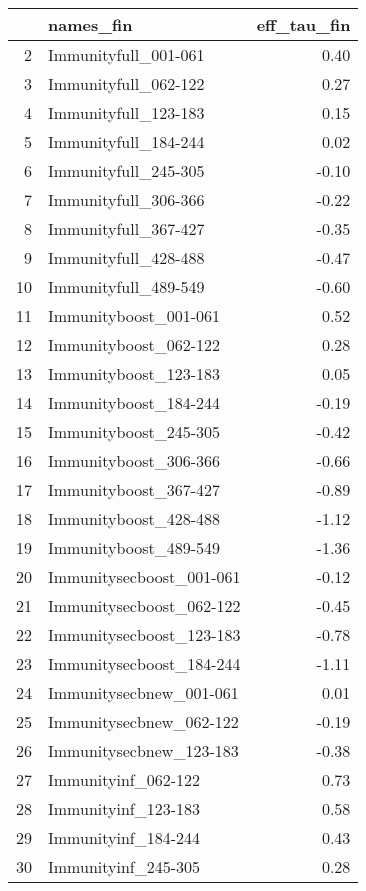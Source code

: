 \begin{table}[ht]
\centering
\begin{tabular}{rlr}
  \hline
 & names\_fin & eff\_tau\_fin \\ 
  \hline
2 & Immunityfull\_001-061 & 0.40 \\ 
  3 & Immunityfull\_062-122 & 0.27 \\ 
  4 & Immunityfull\_123-183 & 0.15 \\ 
  5 & Immunityfull\_184-244 & 0.02 \\ 
  6 & Immunityfull\_245-305 & -0.10 \\ 
  7 & Immunityfull\_306-366 & -0.22 \\ 
  8 & Immunityfull\_367-427 & -0.35 \\ 
  9 & Immunityfull\_428-488 & -0.47 \\ 
  10 & Immunityfull\_489-549 & -0.60 \\ 
  11 & Immunityboost\_001-061 & 0.52 \\ 
  12 & Immunityboost\_062-122 & 0.28 \\ 
  13 & Immunityboost\_123-183 & 0.05 \\ 
  14 & Immunityboost\_184-244 & -0.19 \\ 
  15 & Immunityboost\_245-305 & -0.42 \\ 
  16 & Immunityboost\_306-366 & -0.66 \\ 
  17 & Immunityboost\_367-427 & -0.89 \\ 
  18 & Immunityboost\_428-488 & -1.12 \\ 
  19 & Immunityboost\_489-549 & -1.36 \\ 
  20 & Immunitysecboost\_001-061 & -0.12 \\ 
  21 & Immunitysecboost\_062-122 & -0.45 \\ 
  22 & Immunitysecboost\_123-183 & -0.78 \\ 
  23 & Immunitysecboost\_184-244 & -1.11 \\ 
  24 & Immunitysecbnew\_001-061 & 0.01 \\ 
  25 & Immunitysecbnew\_062-122 & -0.19 \\ 
  26 & Immunitysecbnew\_123-183 & -0.38 \\ 
  27 & Immunityinf\_062-122 & 0.73 \\ 
  28 & Immunityinf\_123-183 & 0.58 \\ 
  29 & Immunityinf\_184-244 & 0.43 \\ 
  30 & Immunityinf\_245-305 & 0.28 \\ 

\end{tabular}
\end{table}
